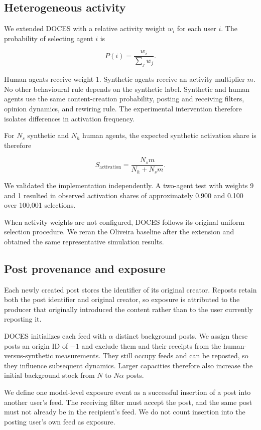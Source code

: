 \documentclass[runningheads]{llncs}
\begin{document}
\subsection{Heterogeneous activity}
We extended DOCES with a relative activity weight \(w_i\) for each user \(i\). The probability of selecting agent \(i\) is

\[
P(i)=\frac{w_i}{\sum_j w_j}. 
\]

Human agents receive weight 1. Synthetic agents receive an activity multiplier \(m\). No other behavioural rule depends on the synthetic label. Synthetic and human agents use the same content-creation probability, posting and receiving filters, opinion dynamics, and rewiring rule. The experimental intervention therefore isolates differences in activation frequency.

For \(N_s\) synthetic and \(N_h\) human agents, the expected synthetic activation share is therefore

\[
S_{\mathrm{activation}} = \frac{N_s m}{N_h + N_s m}. 
\]

We validated the implementation independently. A two-agent test with weights 9 and 1 resulted in observed activation shares of approximately 0.900 and 0.100 over 100,001 selections.

When activity weights are not configured, DOCES follows its original uniform selection procedure. We reran the Oliveira baseline after the extension and obtained the same representative simulation results.

\subsection{Post provenance and exposure}
Each newly created post stores the identifier of its original creator. Reposts retain both the post identifier and original creator, so exposure is attributed to the producer that originally introduced the content rather than to the user currently reposting it.

DOCES initializes each feed with \(\alpha\) distinct background posts. We assign these posts an origin ID of \(-1\) and exclude them and their receipts from the human-versus-synthetic measurements. They still occupy feeds and can be reposted, so they influence subsequent dynamics. Larger capacities therefore also increase the initial background stock from \(N\) to \(N\alpha\) posts.

We define one model-level exposure event as a successful insertion of a post into another user's feed. The receiving filter must accept the post, and the same post must not already be in the recipient's feed. We do not count insertion into the posting user's own feed as exposure.
\end{document}
